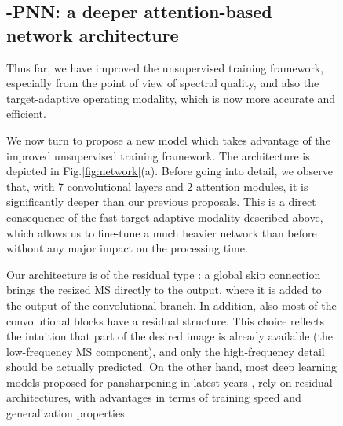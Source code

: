 \documentclass[journal]{IEEEtran}
\begin{document}
\begin{figure}
\subsection{-PNN: a deeper attention-based network architecture}

Thus far,
we have improved the unsupervised training framework, especially from the point of view of spectral quality,
and also the target-adaptive operating modality, which is now more accurate and efficient.

We now turn to propose a new model which takes advantage of the improved unsupervised training framework.
The architecture is depicted in Fig.\ref{fig:network}(a).
Before going into detail, we observe that, with 7 convolutional layers and 2 attention modules, it is significantly deeper than our previous proposals.
This is a direct consequence of the fast target-adaptive modality described above,
which allows us to fine-tune a much heavier network than before without any major impact on the processing time.

Our architecture is of the residual type \cite{He2016}:
a global skip connection brings the resized MS directly to the output,
where it is added to the output of the convolutional branch.
In addition, also most of the convolutional blocks have a residual structure.
This choice reflects the intuition that part of the desired image is already available (the low-frequency MS component),
and only the high-frequency detail should be actually predicted.
On the other hand, most deep learning models proposed for pansharpening in latest years \cite{Yang2017, Wei2017L, Yuan2018, Deng2020, Luo2020, Ciotola2022},
rely on residual architectures, with advantages in terms of training speed and generalization properties.


\end{figure}
\end{document}
